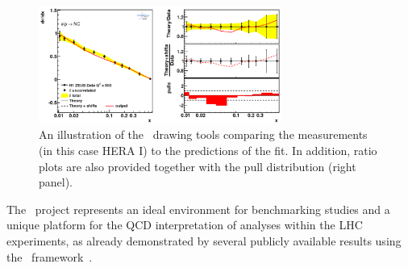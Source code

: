 \begin{description}
\begin{figure}[!ht]
   \centering
   \includegraphics[width=8cm]{datatheory.pdf}
   \caption{An illustration of the \fitter~drawing tools comparing the measurements (in this case HERA I) to the predictions of the fit. In addition, ratio plots are also provided together with the pull distribution (right panel).} 
 \label{fig:data}
\end{figure}

\end{description}
%


The \fitter~project represents 
an ideal environment for benchmarking studies and a unique platform for the QCD interpretation of analyses within the LHC experiments,
as already demonstrated by several publicly available results using the \fitter\ framework~\cite{atlas:strange,atlas:jets,atlas:hm,cms:strange,cms:jets,h1:2012kk,h1zeus:charm}.  

